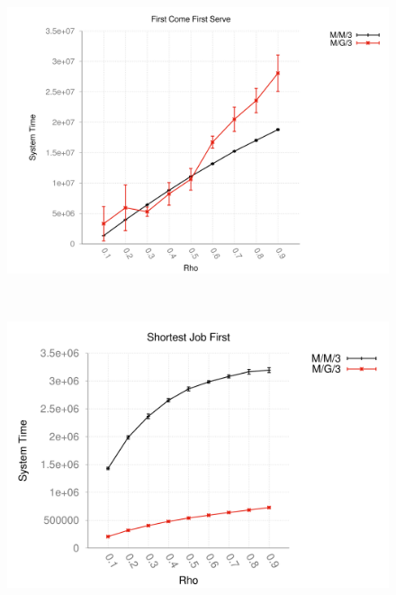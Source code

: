 \begin{figure}[ht!]
 \centering
 \captionsetup{justification=centering}
 \begin{minipage}[]{0.48\linewidth}
  \centering
 \includegraphics[width=\linewidth]{Figures/task3/fcfs.png}
 \label{fig1} 
 \end{minipage}~~~~\begin{minipage}[]{0.48\linewidth}
  \centering
  \includegraphics[width=\linewidth]{Figures/task3/sjf.png}
  \label{fig2}
 \end{minipage}
\end{figure}
